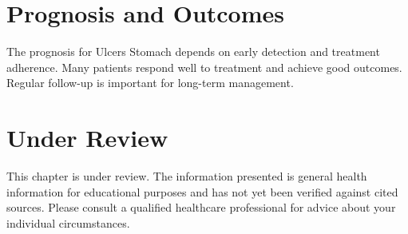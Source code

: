 \section*{Prognosis and Outcomes}
The prognosis for Ulcers Stomach depends on early detection and treatment adherence. Many patients respond well to treatment and achieve good outcomes. Regular follow-up is important for long-term management.
\section*{Under Review}
This chapter is under review. The information presented is general health information for educational purposes and has not yet been verified against cited sources. Please consult a qualified healthcare professional for advice about your individual circumstances.


\clearpage
